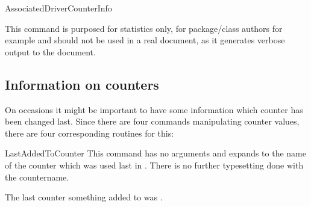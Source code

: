 \documentclass[12pt,paper=a4]{article}
\begin{document}
\begin{docCommand}{AssociatedDriverCounterInfo}{}

This command is purposed for statistics only, for package/class authors for example and should not be used in a real document, as it generates verbose output to the document.



\begin{dispExample}
%
%
\end{dispExample}

\begin{dispExample}
%
\end{dispExample}

\begin{dispExample}
%
\end{dispExample}


\end{docCommand}%

\subsection{Information on counters}

On occasions it might be important to have some information which counter has been changed last. Since there are four commands manipulating counter values, there are four corresponding routines for this:

\begin{docCommand}{LastAddedToCounter}{}
This command has no arguments and expands to the name of the counter which was used last in . There is no further typesetting done with the countername. 

\begin{dispExample}
  
  \addtocounter{SomeCounter}{10}

  The last counter something added to was \PrettyPrintCounterName{\LastAddedToCounter}.
\end{dispExample}%

\end{docCommand}%
\end{document}
